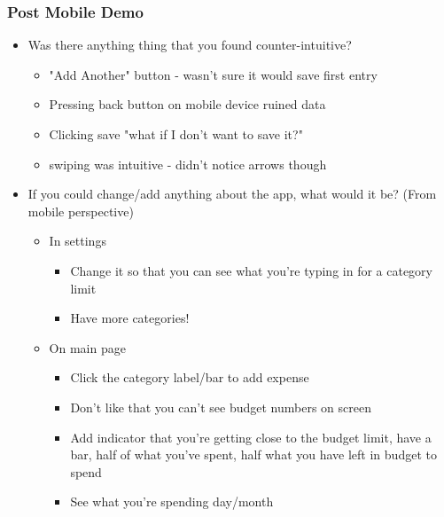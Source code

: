 \documentclass{chi2011}
\begin{document}
	\subsubsection{Post Mobile Demo}
	\begin{itemize}[noitemsep]
		\item Was there anything thing that you found counter-intuitive?
		\begin{itemize}[noitemsep]
			\item "Add Another" button - wasn't sure it would save first entry
			\item Pressing back button on mobile device ruined data
			\item Clicking save "what if I don't want to save it?"
			\item swiping was intuitive - didn't notice arrows though
		\end{itemize}
		\item If you could change/add anything about the app, what would it be? (From mobile perspective)
		\begin{itemize}[noitemsep]
			\item In settings 
			\begin{itemize}[noitemsep]
				\item Change it so that you can see what you're typing in for a category limit
				\item Have more categories!
			\end{itemize}
			\item On main page
			\begin{itemize}[noitemsep]
				\item Click the category label/bar to add expense
				\item Don't like that you can't see budget numbers on screen 
				\item Add indicator that you're getting close to the budget limit, have a bar, half of what
				  you've spent, half what you have left in budget to spend
				\item See what you're spending day/month
			\end{itemize}
		\end{itemize}
	\end{itemize}
\end{document}
